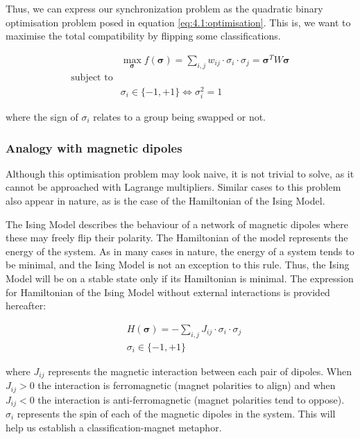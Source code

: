\documentclass[../main.tex]{subfiles}
\begin{document}
Thus, we can express our synchronization problem as the quadratic binary optimisation problem posed in equation \eqref{eq:4.1:optimisation}. This is, we want to maximise the total compatibility by flipping some classifications.

\begin{equation}\label{eq:4.1:optimisation}
\begin{aligned}
    & \max_{\bm{\sigma}} f(\bm{\sigma}) = \sum_{i, j} w_{ij} \cdot \sigma_i \cdot \sigma_j = \bm{\sigma}^T W \bm{\sigma}\\
    \text{subject to}\\
    & \sigma_i \in \{-1, +1\} \Leftrightarrow \sigma_i^2 = 1
\end{aligned}
\end{equation}

where the sign of $\sigma_i$ relates to a group being swapped or not. 

\subsubsection{Analogy with magnetic dipoles}
Although this optimisation problem may look naive, it is not trivial to solve, as it cannot be approached with Lagrange multipliers. Similar cases to this problem also appear in nature, as is the case of the Hamiltonian of the Ising Model\cite{kennedy2008}.

The Ising Model describes the behaviour of a network of magnetic dipoles where these may freely flip their polarity. The Hamiltonian of the model represents the energy of the system\cite{kennedy2008}. As in many cases in nature, the energy of a system tends to be minimal, and the Ising Model is not an exception to this rule. Thus, the Ising Model will be on a stable state only if its Hamiltonian is minimal. The expression for Hamiltonian of the Ising Model without external interactions is provided hereafter:

\begin{equation}\label{eq:4.1:ising}
\begin{aligned}
    & H(\bm{\sigma}) = -\sum_{i, j} J_{ij} \cdot \sigma_i \cdot \sigma_j\\
    & \sigma_i \in \{-1, +1\}
\end{aligned}
\end{equation}

where $J_{ij}$ represents the magnetic interaction between each pair of dipoles. When $J_{ij} > 0$ the interaction is ferromagnetic (magnet polarities to align) and when $J_{ij} < 0$ the interaction is anti-ferromagnetic (magnet polarities tend to oppose). $\sigma_i$ represents the spin of each of the magnetic dipoles in the system. This will help us establish a classification-magnet metaphor.
\end{document}
